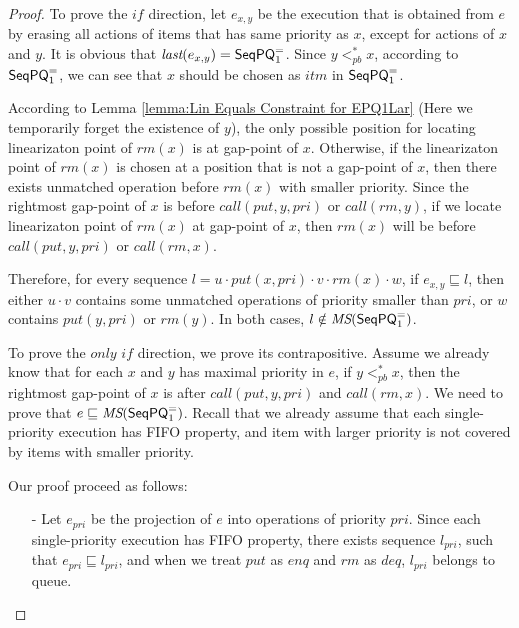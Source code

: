 \begin {proof}

To prove the $\textit{if}$ direction, let $e_{x,y}$ be the execution that is obtained from $e$ by erasing all actions of items that has same priority as $x$, except for actions of $x$ and $y$. It is obvious that $\textit{last}(e_{x,y}) = \mathsf{SeqPQ}_1^{=}$. Since $y <_{\textit{pb}}^* x$, according to $\mathsf{SeqPQ}_1^{=}$, we can see that $x$ should be chosen as $\textit{itm}$ in $\mathsf{SeqPQ}_1^{=}$.

According to Lemma \ref{lemma:Lin Equals Constraint for EPQ1Lar} (Here we temporarily forget the existence of $y$), the only possible position for locating linearizaton point of $\textit{rm}(x)$ is at gap-point of $x$. Otherwise, if the linearizaton point of $\textit{rm}(x)$ is chosen at a position that is not a gap-point of $x$, then there exists unmatched operation before $\textit{rm}(x)$ with smaller priority. Since the rightmost gap-point of $x$ is before $\textit{call}(\textit{put},y,\textit{pri})$ or $\textit{call}(\textit{rm},y)$, if we locate linearizaton point of $\textit{rm}(x)$ at gap-point of $x$, then $\textit{rm}(x)$ will be before $\textit{call}(\textit{put},y,\textit{pri})$ or $\textit{call}(\textit{rm},x)$.

Therefore, for every sequence $l = u \cdot \textit{put}(x,\textit{pri}) \cdot v \cdot \textit{rm}(x) \cdot w$, if $e_{x,y} \sqsubseteq l$, then either $u \cdot v$ contains some unmatched operations of priority smaller than $\textit{pri}$, or $w$ contains $\textit{put}(y,\textit{pri})$ or $\textit{rm}(y)$. In both cases, $l \notin \textit{MS}(\mathsf{SeqPQ}_1^{=})$.

To prove the $\textit{only if}$ direction, we prove its contrapositive. Assume we already know that for each $x$ and $y$ has maximal priority in $e$, if $y <_{\textit{pb}}^* x$, then the rightmost gap-point of $x$ is after $\textit{call}(\textit{put},y,\textit{pri})$ and $\textit{call}(\textit{rm},x)$. We need to prove that $e \sqsubseteq \textit{MS}(\mathsf{SeqPQ}_1^{=})$. Recall that we already assume that each single-priority execution has FIFO property, and item with larger priority is not covered by items with smaller priority.

Our proof proceed as follows:

\begin{itemize}
\setlength{\itemsep}{0.5pt}
\item[-] Let $e_{\textit{pri}}$ be the projection of $e$ into operations of priority $\textit{pri}$. Since each single-priority execution has FIFO property, there exists sequence $l_{\textit{pri}}$, such that $e_{\textit{pri}} \sqsubseteq l_{\textit{pri}}$, and when we treat $\textit{put}$ as $\textit{enq}$ and $\textit{rm}$ as $\textit{deq}$, $l_{\textit{pri}}$ belongs to queue.


\end{itemize}
\end{proof}
